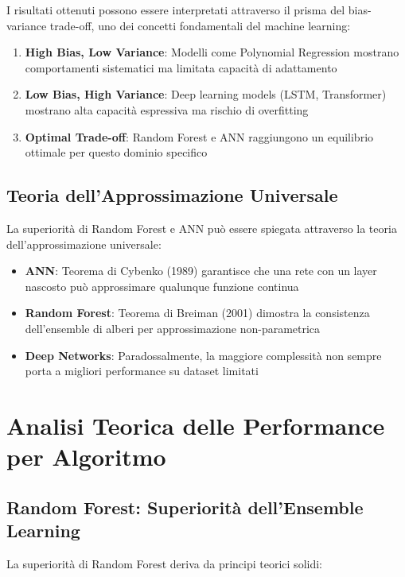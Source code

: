 \documentclass[12pt,a4paper,twoside]{report}
\begin{document}
\begin{appendices}
I risultati ottenuti possono essere interpretati attraverso il prisma del bias-variance trade-off, uno dei concetti fondamentali del machine learning:

\begin{enumerate}
    \item \textbf{High Bias, Low Variance}: Modelli come Polynomial Regression mostrano comportamenti sistematici ma limitata capacità di adattamento
    \item \textbf{Low Bias, High Variance}: Deep learning models (LSTM, Transformer) mostrano alta capacità espressiva ma rischio di overfitting
    \item \textbf{Optimal Trade-off}: Random Forest e ANN raggiungono un equilibrio ottimale per questo dominio specifico
\end{enumerate}

\subsection{Teoria dell'Approssimazione Universale}

La superiorità di Random Forest e ANN può essere spiegata attraverso la teoria dell'approssimazione universale:

\begin{itemize}
    \item \textbf{ANN}: Teorema di Cybenko (1989) garantisce che una rete con un layer nascosto può approssimare qualunque funzione continua
    \item \textbf{Random Forest}: Teorema di Breiman (2001) dimostra la consistenza dell'ensemble di alberi per approssimazione non-parametrica
    \item \textbf{Deep Networks}: Paradossalmente, la maggiore complessità non sempre porta a migliori performance su dataset limitati
\end{itemize}

\section{Analisi Teorica delle Performance per Algoritmo}

\subsection{Random Forest: Superiorità dell'Ensemble Learning}

La superiorità di Random Forest deriva da principi teorici solidi:


\end{appendices}
\end{document}
